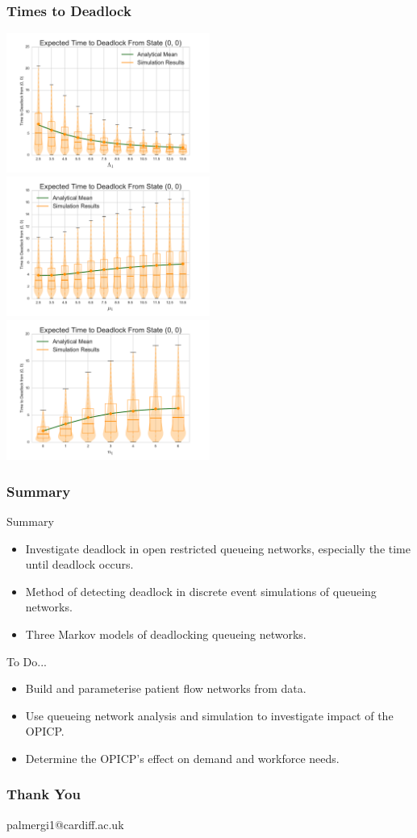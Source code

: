 \documentclass[xcolor={table}]{beamer}
\begin{document}
\begin{frame}
    \frametitle{Times to Deadlock}
    \includegraphics[width=0.5\textwidth]{img/vary_L1fb}
    \includegraphics[width=0.5\textwidth]{img/vary_mu1fb}\newline
    \centering
    \includegraphics[width=0.5\textwidth]{img/vary_n1fb}
\end{frame}

\begin{frame}
\frametitle{Summary}
\begin{block}{Summary}
\begin{itemize}
\item Investigate deadlock in open restricted queueing networks, especially the time until deadlock occurs.
\item Method of detecting deadlock in discrete event simulations of queueing networks.
\item Three Markov models of deadlocking queueing networks.
\end{itemize}
\end{block}

\begin{block}{To Do...}
\begin{itemize}
\item Build and parameterise patient flow networks from data.
\item Use queueing network analysis and simulation to investigate impact of the OPICP.
\item Determine the OPICP's effect on demand and workforce needs.
\end{itemize}
\end{block}
\end{frame}


\begin{frame}
    \frametitle{Thank You}
    palmergi1@cardiff.ac.uk
\end{frame}
\end{document}
